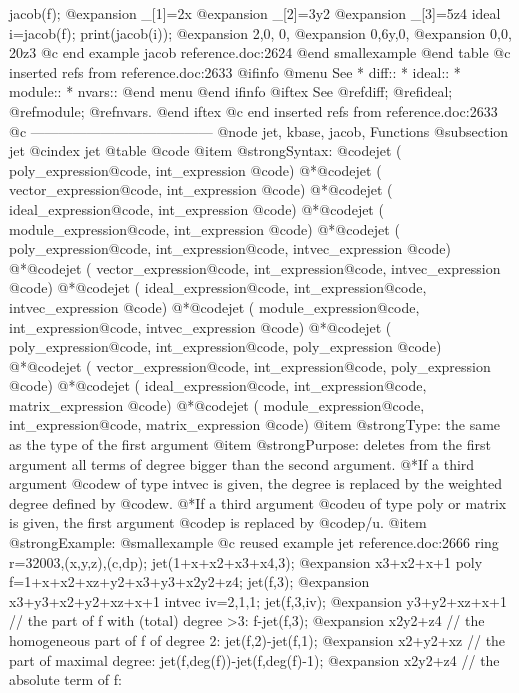 {  jacob(f);
@expansion{} _[1]=2x
@expansion{} _[2]=3y2
@expansion{} _[3]=5z4
  ideal i=jacob(f);
  print(jacob(i));
@expansion{} 2,0, 0,  
@expansion{} 0,6y,0,  
@expansion{} 0,0, 20z3
@c end example jacob reference.doc:2624
@end smallexample
@end table
@c inserted refs from reference.doc:2633
@ifinfo
@menu
See
* diff::
* ideal::
* module::
* nvars::
@end menu
@end ifinfo
@iftex
See
@ref{diff};
@ref{ideal};
@ref{module};
@ref{nvars}.
@end iftex
@c end inserted refs from reference.doc:2633
@c ---------------------------------------
@node jet, kbase, jacob, Functions
@subsection jet
@cindex jet
@table @code
@item @strong{Syntax:}
@code{jet (} poly_expression@code{,} int_expression @code{)}
@*@code{jet (} vector_expression@code{,} int_expression @code{)}
@*@code{jet (} ideal_expression@code{,} int_expression @code{)}
@*@code{jet (} module_expression@code{,} int_expression @code{)}
@*@code{jet (} poly_expression@code{,} int_expression@code{,} intvec_expression @code{)}
@*@code{jet (} vector_expression@code{,} int_expression@code{,} intvec_expression @code{)}
@*@code{jet (} ideal_expression@code{,} int_expression@code{,} intvec_expression @code{)}
@*@code{jet (} module_expression@code{,} int_expression@code{,} intvec_expression @code{)}
@*@code{jet (} poly_expression@code{,} int_expression@code{,} poly_expression @code{)}
@*@code{jet (} vector_expression@code{,} int_expression@code{,} poly_expression @code{)}
@*@code{jet (} ideal_expression@code{,} int_expression@code{,} matrix_expression @code{)}
@*@code{jet (} module_expression@code{,} int_expression@code{,} matrix_expression @code{)}
@item @strong{Type:}
the same as the type of the first argument
@item @strong{Purpose:}
deletes from the first argument all terms of degree bigger than the second argument.
@*If a third argument @code{w} of type intvec is given, the degree is replaced by the weighted degree defined by @code{w}.
@*If a third argument @code{u} of type poly or matrix is given, the first argument @code{p} is replaced by @code{p/u}.
@item @strong{Example:}
@smallexample
@c reused example jet reference.doc:2666 
  ring r=32003,(x,y,z),(c,dp);
  jet(1+x+x2+x3+x4,3);
@expansion{} x3+x2+x+1
  poly f=1+x+x2+xz+y2+x3+y3+x2y2+z4;
  jet(f,3);
@expansion{} x3+y3+x2+y2+xz+x+1
  intvec iv=2,1,1;
  jet(f,3,iv);
@expansion{} y3+y2+xz+x+1
  // the part of f with (total) degree >3:
  f-jet(f,3);
@expansion{} x2y2+z4
  // the homogeneous part of f of degree 2:
  jet(f,2)-jet(f,1);
@expansion{} x2+y2+xz
  // the part of maximal degree:
  jet(f,deg(f))-jet(f,deg(f)-1);
@expansion{} x2y2+z4
  // the absolute term of f:
}

